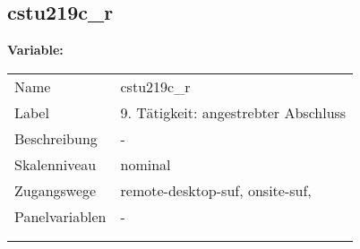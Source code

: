 	
	
	\subsection{cstu219c\_r}
	\label{subSection:cstu219c_r}

	\noindent\textbf{Variable:}\\
		\begin{tabular}{lL{11.3cm}}
			\label{tableVariable:cstu219c_r}
			Name & cstu219c\_r \\
			Label & 9. Tätigkeit: angestrebter Abschluss \\
			Beschreibung & - \\
			Skalenniveau & nominal \\
			Zugangswege &
				remote-desktop-suf,
				onsite-suf,
 \\
			Panelvariablen & -
			 \\
			 \\
 \\
		\end{tabular}






